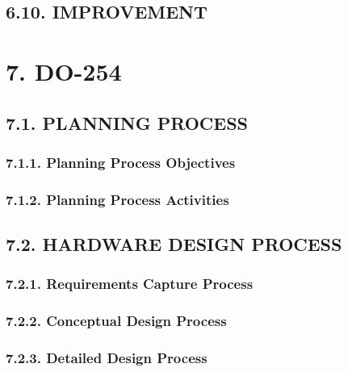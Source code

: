 \documentclass[
]{article}
\begin{document}
\hypertarget{improvement}{%
\subsection{6.10. IMPROVEMENT}\label{improvement}}

\hypertarget{do-254}{%
\section{7. DO-254}\label{do-254}}

\hypertarget{planning-process}{%
\subsection{7.1. PLANNING PROCESS}\label{planning-process}}

\hypertarget{planning-process-objectives}{%
\subsubsection{7.1.1. Planning Process
Objectives}\label{planning-process-objectives}}

\hypertarget{planning-process-activities}{%
\subsubsection{7.1.2. Planning Process
Activities}\label{planning-process-activities}}

\hypertarget{hardware-design-process}{%
\subsection{7.2. HARDWARE DESIGN
PROCESS}\label{hardware-design-process}}

\hypertarget{requirements-capture-process}{%
\subsubsection{7.2.1. Requirements Capture
Process}\label{requirements-capture-process}}

\hypertarget{conceptual-design-process}{%
\subsubsection{7.2.2. Conceptual Design
Process}\label{conceptual-design-process}}

\hypertarget{detailed-design-process}{%
\subsubsection{7.2.3. Detailed Design
Process}\label{detailed-design-process}}
\end{document}
